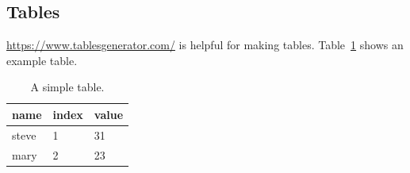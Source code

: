 \documentclass[doc,natbib,floatsintext]{apa7}
\begin{document}
\subsection{Tables} 

\url{https://www.tablesgenerator.com/} is helpful for making tables. Table~\ref{tab:simple_table} shows an example table. 

\begin{table}[b]
\caption{A simple table.}
\label{tab:simple_table}
\begin{tabular}{lll}
\toprule
name  & index & value \\
\midrule
steve & 1     & 31    \\
mary  & 2     & 23   \\
\bottomrule
\end{tabular}
\end{table}

\clearpage 


\end{document}
